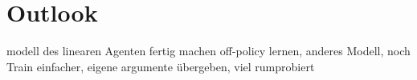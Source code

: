 \chapter{Outlook}
modell des linearen Agenten fertig machen
off-policy lernen, anderes Modell, noch 
Train einfacher, eigene argumente übergeben, viel rumprobiert